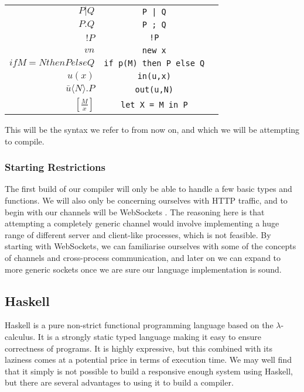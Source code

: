 \begin{table}[hc!]
    \begin{tabular}{r c l}
        $P|Q$& \verb!P | Q!\\
        $P.Q$& \verb!P ; Q!\\
        $!P$ & \verb?!P?\\
        $vn$& \verb!new x!\\
        $if M=N then P else Q $&\verb!if p(M) then P else Q! \\
        $u(x)$&\verb!in(u,x)! \\
        $\bar{u}\langle N \rangle .P$&\verb!out(u,N)! \\
        $\left[ \frac{M}{x} \right]$&\verb!let X = M in P!\\
    \end{tabular}
\end{table} 

This will be the syntax we refer to from now on, and which we will be attempting to compile.

\subsubsection{Starting Restrictions}

The first build of our compiler will only be able to handle a few basic types and functions. We will also only be concerning ourselves with HTTP traffic, and to begin with our channels will be WebSockets \cite{wiki:ws}. The reasoning here is that attempting a completely generic channel would involve implementing a huge range of different server and client-like processes, which is not feasible. By starting with WebSockets, we can familiarise ourselves with some of the concepts of
channels and cross-process communication, and later on we can expand to more generic sockets once we are sure our language implementation is sound.

\subsection{Haskell}

Haskell is a pure non-strict functional programming language based on the $\lambda$-calculus. It is a strongly static typed language making it easy to ensure correctness of programs. It is highly expressive, but this combined with its laziness comes at a potential price in terms of execution time. We may well find that it simply is not possible to build a responsive enough system using Haskell, but there are several advantages to using it to build a compiler.

